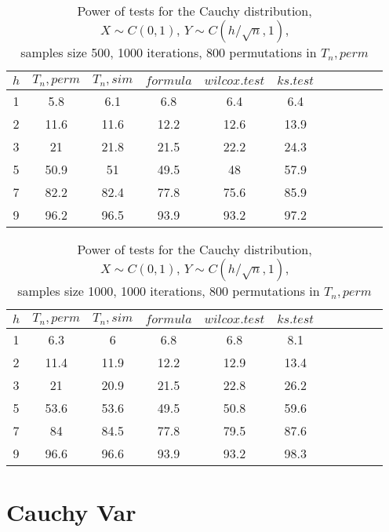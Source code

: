 \documentclass{report}
\begin{document}
\begin{longtable}{|c|c|c|c|c|c|c|c|c|c|c|}
  \caption{Power of tests for the Cauchy distribution, \\
           $X\sim C(0,1)$, $Y\sim C(h/\sqrt{n},1)$, \\
           samples size 500, 1000 iterations, 800 permutations in $T_n, perm$} \\
  \hline
  $h$ & $T_n, perm$ & $T_n, sim$ & $formula$ & $wilcox.test$ & $ks.test$ \\ \hline
  1 & 5.8   & 6.1      & 6.8       & 6.4           & 6.4       \\
  2 & 11.6  & 11.6     & 12.2      & 12.6          & 13.9      \\
  3 & 21    & 21.8     & 21.5      & 22.2          & 24.3      \\
  5 & 50.9  & 51       & 49.5      & 48            & 57.9      \\
  7 & 82.2  & 82.4     & 77.8      & 75.6          & 85.9      \\
  9 & 96.2  & 96.5     & 93.9      & 93.2          & 97.2      \\ \hline
\end{longtable}

\begin{longtable}{|c|c|c|c|c|c|c|c|c|c|c|}
  \caption{Power of tests for the Cauchy distribution, \\
           $X\sim C(0,1)$, $Y\sim C(h/\sqrt{n},1)$, \\
           samples size 1000, 1000 iterations, 800 permutations in $T_n, perm$} \\
  \hline
  $h$  & $T_n, perm$ & $T_n, sim$ & $formula$ & $wilcox.test$ & $ks.test$ \\ \hline
  1 & 6.3 & 6 & 6.8 & 6.8 & 8.1 \\
  2 & 11.4 & 11.9 & 12.2 & 12.9 & 13.4 \\
  3 & 21 & 20.9 & 21.5 & 22.8 & 26.2 \\
  5 & 53.6 & 53.6 & 49.5 & 50.8 & 59.6 \\
  7 & 84 & 84.5 & 77.8 & 79.5 & 87.6 \\
  9 & 96.6 & 96.6 & 93.9 & 93.2 & 98.3 \\
  \hline
\end{longtable}

\newpage

\section*{Cauchy Var}
\end{document}
